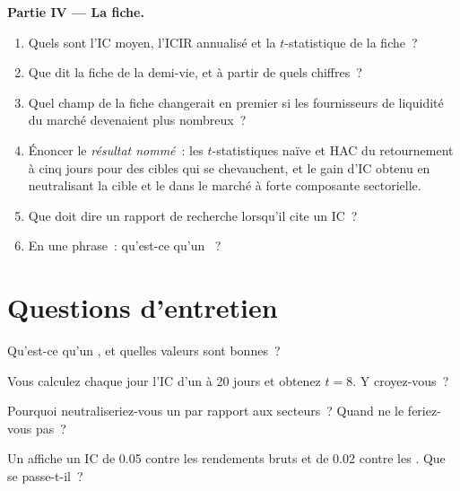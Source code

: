 \begin{problem}
\medskip\noindent\textbf{Partie IV --- La fiche.}
\begin{enumerate}[resume]
\item Quels sont l'IC moyen, l'ICIR annualisé et la $t$-statistique de la fiche~?
\item Que dit la fiche de la demi-vie, et à partir de quels chiffres~?
\item Quel champ de la fiche changerait en premier si les fournisseurs de liquidité du marché devenaient plus nombreux~?
\item Énoncer le \emph{résultat nommé}~: les $t$-statistiques naïve et HAC du retournement à cinq jours pour des cibles qui se chevauchent, et le gain d'IC obtenu en neutralisant
la cible et le  dans le marché à forte composante sectorielle.
\item Que doit dire un rapport de recherche lorsqu'il cite un IC~?
\item En une phrase~: qu'est-ce qu'un ~?
\end{enumerate}
\end{problem}

\section{Questions d'entretien}

\begin{interviewq}\label{iq:rs:anatomy-of-a-predictor:1}
Qu'est-ce qu'un , et quelles valeurs sont bonnes~?
\end{interviewq}

\begin{interviewq}\label{iq:rs:anatomy-of-a-predictor:2}
Vous calculez chaque jour l'IC d'un  à 20 jours et obtenez $t = 8$. Y croyez-vous~?
\end{interviewq}

\begin{interviewq}\label{iq:rs:anatomy-of-a-predictor:3}
Pourquoi neutraliseriez-vous un  par rapport aux secteurs~? Quand ne le feriez-vous pas~?
\end{interviewq}

\begin{interviewq}\label{iq:rs:anatomy-of-a-predictor:4}
Un  affiche un IC de 0.05 contre les rendements bruts et de 0.02 contre les . Que se passe-t-il~?
\end{interviewq}

